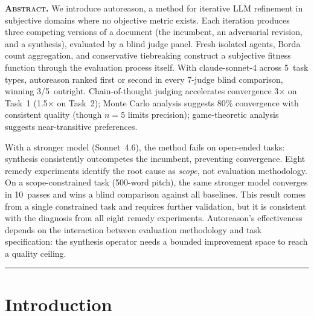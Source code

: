 \documentclass[10pt,twocolumn]{article}
\begin{document}

\noindent\textbf{\scshape Abstract.}\enspace
We introduce autoreason, a method for iterative LLM refinement in subjective domains where no objective metric exists. Each iteration produces three competing versions of a document (the incumbent, an adversarial revision, and a synthesis), evaluated by a blind judge panel. Fresh isolated agents, Borda count aggregation, and conservative tiebreaking construct a subjective fitness function through the evaluation process itself. With claude-sonnet-4 across 5~task types, autoreason ranked first or second in every 7-judge blind comparison, winning 3/5~outright. Chain-of-thought judging accelerates convergence 3$\times$ on Task~1 (1.5$\times$ on Task~2); Monte Carlo analysis suggests 80\% convergence with consistent quality (though $n{=}5$ limits precision); game-theoretic analysis suggests near-transitive preferences.

With a stronger model (Sonnet~4.6), the method fails on open-ended tasks: synthesis consistently outcompetes the incumbent, preventing convergence. Eight remedy experiments identify the root cause as \textit{scope}, not evaluation methodology. On a scope-constrained task (500-word pitch), the same stronger model converges in 10~passes and wins a blind comparison against all baselines. This result comes from a single constrained task and requires further validation, but it is consistent with the diagnosis from all eight remedy experiments. Autoreason's effectiveness depends on the interaction between evaluation methodology and task specification: the synthesis operator needs a bounded improvement space to reach a quality ceiling.

\vspace{6pt}
\hrule
\vspace{6pt}

\section{Introduction}
\end{document}
